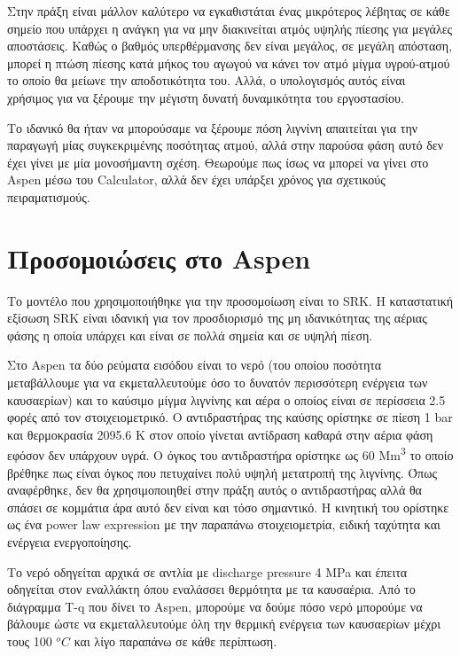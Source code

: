 \documentclass[11pt]{article}
\begin{document}
Στην πράξη είναι μάλλον καλύτερο να εγκαθιστάται ένας μικρότερος λέβητας σε κάθε σημείο που υπάρχει η ανάγκη για να μην διακινείται ατμός υψηλής πίεσης για μεγάλες αποστάσεις. Καθώς ο βαθμός υπερθέρμανσης δεν είναι μεγάλος, σε μεγάλη απόσταση, μπορεί η πτώση πίεσης κατά μήκος του αγωγού να κάνει τον ατμό μίγμα υγρού-ατμού το οποίο θα μείωνε την αποδοτικότητα του. Αλλά, ο υπολογισμός αυτός είναι χρήσιμος για να ξέρουμε την μέγιστη δυνατή δυναμικότητα του εργοστασίου.

Το ιδανικό θα ήταν να μπορούσαμε να ξέρουμε πόση λιγνίνη απαιτείται για την παραγωγή μίας συγκεκριμένης ποσότητας ατμού, αλλά στην παρούσα φάση αυτό δεν έχει γίνει με μία μονοσήμαντη σχέση. Θεωρούμε πως ίσως να μπορεί να γίνει στο Aspen μέσω του Calculator, αλλά δεν έχει υπάρξει χρόνος για σχετικούς πειραματισμούς.

\section{Προσομοιώσεις στο Aspen}
\label{sec:orgc3d1b0c}
Το μοντέλο που χρησιμοποιήθηκε για την προσομοίωση είναι το SRK. Η καταστατική εξίσωση SRK είναι ιδανική για τον προσδιορισμό της μη ιδανικότητας της αέριας φάσης η οποία υπάρχει και είναι σε πολλά σημεία και σε υψηλή πίεση.

Στο Aspen τα δύο ρεύματα εισόδου είναι το νερό (του οποίου ποσότητα μεταβάλλουμε για να εκμεταλλευτούμε όσο το δυνατόν περισσότερη ενέργεια των καυσαερίων) και το καύσιμο μίγμα λιγνίνης και αέρα ο οποίος είναι σε περίσσεια 2.5 φορές από τον στοιχειομετρικό. Ο αντιδραστήρας της καύσης ορίστηκε σε πίεση 1 bar και θερμοκρασία 2095.6 Κ στον οποίο γίνεται αντίδραση καθαρά στην αέρια φάση εφόσον δεν υπάρχουν υγρά. Ο όγκος του αντιδραστήρα ορίστηκε ως 60 Mm\textsuperscript{3} το οποίο βρέθηκε πως είναι όγκος που πετυχαίνει πολύ υψηλή μετατροπή της λιγνίνης. Όπως αναφέρθηκε, δεν θα χρησιμοποιηθεί στην πράξη αυτός ο αντιδραστήρας αλλά θα σπάσει σε κομμάτια άρα αυτό δεν είναι και τόσο σημαντικό. Η κινητική του ορίστηκε ως ένα power law expression με την παραπάνω στοιχειομετρία, ειδική ταχύτητα και ενέργεια ενεργοποίησης.

Το νερό οδηγείται αρχικά σε αντλία με discharge pressure 4 MPa και έπειτα οδηγείται στον εναλλάκτη όπου εναλάσσει θερμότητα με τα καυσαέρια. Από το διάγραμμα T-q που δίνει το Aspen, μπορούμε να δούμε πόσο νερό μπορούμε να βάλουμε ώστε να εκμεταλλευτούμε όλη την θερμική ενέργεια των καυσαερίων μέχρι τους 100 \(^oC\) και λίγο παραπάνω σε κάθε περίπτωση.
\end{document}

